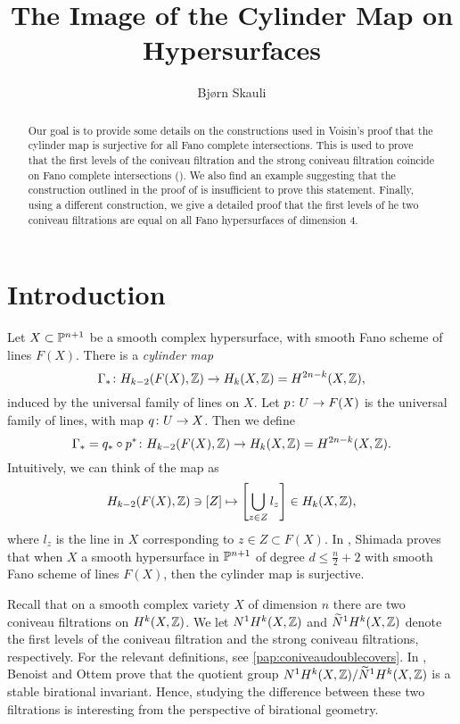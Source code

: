 \title{The Image of the Cylinder Map on Hypersurfaces}
\author{Bjørn Skauli}
\date{}

	\maketitle

\label{pap:coniveauhypersurfaces}
        \begin{abstract}
          Our goal is to provide some details on the constructions used in Voisin's proof that the cylinder map is surjective for all Fano complete intersections. This is used to prove that the first levels of the coniveau filtration and the strong coniveau filtration coincide on Fano complete intersections  (\cite[Theorem 1.13]{VoisinConiveauThreefolds}). We also find an example suggesting that the construction outlined in the proof of \cite{VoisinConiveauThreefolds} is insufficient to prove this statement. Finally, using a different construction, we give a detailed proof that the first levels of he two coniveau filtrations are equal on all Fano hypersurfaces of dimension 4.
        \end{abstract}
	
\section{Introduction}
Let $X \subset \P^{n+1}$ be a smooth complex hypersurface, with smooth Fano scheme of lines $F(X)$. There is a \emph{cylinder map} 
\[\Gamma_* \from H_{k-2}(F(X),\Z) \to H_k(X,\Z) = H^{2n-k}(X,\Z), \]
induced by the universal family of lines on $X$. Let $p \from U \to F(X)$ is the universal family of lines, with map $q \from U \to X$. Then we define 
\[ \Gamma_* = q_* \circ p^* \from H_{k-2}(F(X),\Z) \to H_k(X,\Z) = H^{2n-k}(X,\Z).\]
Intuitively, we can think of the map as
\[H_{k-2}(F(X),\Z) \ni [Z] \mapsto \left[\bigcup_{z \in Z} l_z\right] \in H_k(X,\Z), \]
where $l_z$ is the line in $X$ corresponding to $z \in Z \subset F(X)$. In \cite{ShimadaHypersurfaces}, Shimada proves that when $X$ a smooth hypersurface  in $\P^{n+1}$ of degree $d \leq \frac{n}{2}+2$ with smooth Fano scheme of lines $F(X)$, then the cylinder map is surjective.

Recall that on a smooth complex variety $X$ of dimension $n$ there are two coniveau filtrations on $H^k(X,\Z)$. We let $N^1H^k(X,\Z)$ and $\widetilde{N}^1H^k(X,\Z)$ denote the first levels of the coniveau filtration and the strong coniveau filtrations, respectively. For the relevant definitions, see \cref{pap:coniveaudoublecovers}. In \cite[Proposition 2.4]{BenoistOttemConiveau}, Benoist and Ottem prove that the quotient group $N^1H^k(X,\Z) / \widetilde{N}^1H^k(X,\Z)$ is a stable birational invariant. Hence, studying the difference between these two filtrations is interesting from the perspective of birational geometry.

